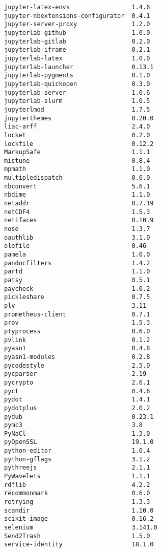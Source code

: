 \begin{verbatim}
jupyter-latex-envs                 1.4.6
jupyter-nbextensions-configurator  0.4.1
jupyter-server-proxy               1.2.0
jupyterlab-github                  1.0.0
jupyterlab-gitlab                  0.2.0
jupyterlab-iframe                  0.2.1
jupyterlab-latex                   1.0.0
jupyterlab-launcher                0.13.1
jupyterlab-pygments                0.1.0
jupyterlab-quickopen               0.3.0
jupyterlab-server                  1.0.6
jupyterlab-slurm                   1.0.5
jupyterlmod                        1.7.5
jupyterthemes                      0.20.0
liac-arff                          2.4.0
locket                             0.2.0
lockfile                           0.12.2
MarkupSafe                         1.1.1
mistune                            0.8.4
mpmath                             1.1.0
multipledispatch                   0.6.0
nbconvert                          5.6.1
nbdime                             1.1.0
netaddr                            0.7.19
netCDF4                            1.5.3
netifaces                          0.10.9
nose                               1.3.7
oauthlib                           3.1.0
olefile                            0.46
pamela                             1.0.0
pandocfilters                      1.4.2
partd                              1.1.0
patsy                              0.5.1
paycheck                           1.0.2
pickleshare                        0.7.5
ply                                3.11
prometheus-client                  0.7.1
prov                               1.5.3
ptyprocess                         0.6.0
pvlink                             0.1.2
pyasn1                             0.4.8
pyasn1-modules                     0.2.8
pycodestyle                        2.5.0
pycparser                          2.19
pycrypto                           2.6.1
pyct                               0.4.6
pydot                              1.4.1
pydotplus                          2.0.2
pydub                              0.23.1
pymc3                              3.8
PyNaCl                             1.3.0
pyOpenSSL                          19.1.0
python-editor                      1.0.4
python-gflags                      3.1.2
pythreejs                          2.1.1
PyWavelets                         1.1.1
rdflib                             4.2.2
recommonmark                       0.6.0
retrying                           1.3.3
scandir                            1.10.0
scikit-image                       0.16.2
selenium                           3.141.0
Send2Trash                         1.5.0
service-identity                   18.1.0

\end{verbatim}
